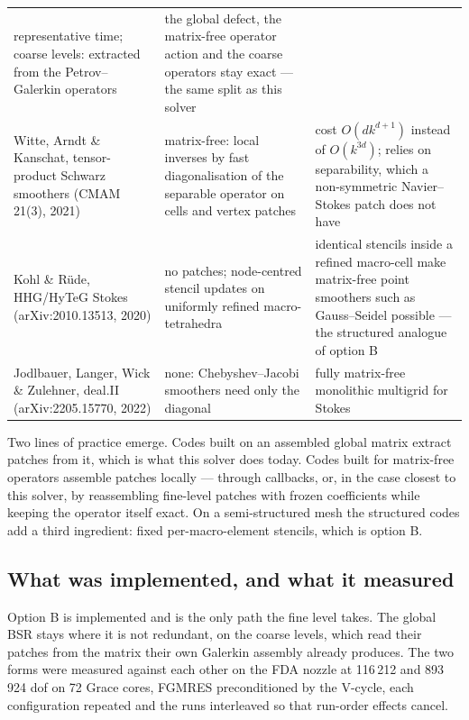 \documentclass[11pt,a4paper]{article}
\begin{document}
\begin{center}
\begin{tabular}{@{}>{\raggedright\arraybackslash}p{3.5cm}>{\raggedright\arraybackslash}p{5.1cm}>{\raggedright\arraybackslash}p{6.4cm}@{}}
representative time; coarse levels: extracted from the Petrov--Galerkin operators &
the global defect, the matrix-free operator action and the coarse operators stay exact --- the same
split as this solver \\[3pt]
Witte, Arndt \& Kanschat, tensor-product Schwarz smoothers (CMAM 21(3), 2021) &
matrix-free: local inverses by fast diagonalisation of the separable operator on cells and vertex
patches &
cost $O(dk^{d+1})$ instead of $O(k^{3d})$; relies on separability, which a non-symmetric
Navier--Stokes patch does not have \\[3pt]
Kohl \& R\"ude, HHG/HyTeG Stokes (arXiv:2010.13513, 2020) &
no patches; node-centred stencil updates on uniformly refined macro-tetrahedra &
identical stencils inside a refined macro-cell make matrix-free point smoothers such as
Gauss--Seidel possible --- the structured analogue of option B \\[3pt]
Jodlbauer, Langer, Wick \& Zulehner, deal.II (arXiv:2205.15770, 2022) &
none: Chebyshev--Jacobi smoothers need only the diagonal &
fully matrix-free monolithic multigrid for Stokes \\
\bottomrule
\end{tabular}
\end{center}

Two lines of practice emerge. Codes built on an assembled global matrix extract patches from it,
which is what this solver does today. Codes built for matrix-free operators assemble patches locally
--- through callbacks, or, in the case closest to this solver, by reassembling fine-level patches
with frozen coefficients while keeping the operator itself exact. On a semi-structured mesh the
structured codes add a third ingredient: fixed per-macro-element stencils, which is option B.

\subsection{What was implemented, and what it measured}

Option B is implemented and is the only path the fine level takes. The global BSR stays where it is
not redundant, on the coarse levels, which read their patches from the matrix their own Galerkin
assembly already produces. The two forms were measured against each other on the FDA nozzle at
116\,212 and 893\,924 dof on 72 Grace cores, FGMRES preconditioned by the V-cycle, each
configuration repeated and the runs interleaved so that run-order effects cancel.
\end{document}
